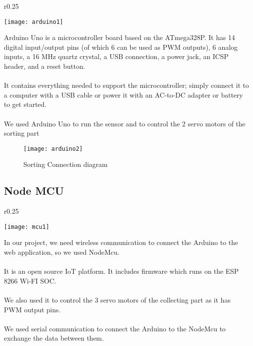 \begin{wrapfigure}{r}{0.25\textwidth}
    \begin{center}
      \texttt{[image: arduino1]}
    \end{center}
  \end{wrapfigure}

  Arduino Uno is a microcontroller board based on the
  ATmega328P. It has 14 digital input/output pins (of which 6
  can be used as PWM outputs), 6 analog inputs, a 16 MHz
  quartz crystal, a USB connection, a power jack, an ICSP
  header, and a reset button.\\\\
  It contains everything needed to support the microcontroller;
  simply connect it to a computer with a USB cable or power it
  with an AC-to-DC adapter or battery to get started.\\\\
  We used Arduino Uno to run the sensor and to control the 2
  servo motors of the sorting part\\


  \begin{figure}[h]
    \texttt{[image: arduino2]}
    \centering
    \caption{Sorting Connection diagram}
    \label{fig:arduino2}
\end{figure}

\subsection{Node MCU}

\begin{wrapfigure}{r}{0.25\textwidth}
    \begin{center}
      \texttt{[image: mcu1]}
    \end{center}
  \end{wrapfigure}

  In our project, we need wireless communication to connect the Arduino
to the web application, so we used NodeMcu.\\\\
It is an open source IoT platform. It includes firmware which runs on
the ESP 8266 Wi-FI SOC.\\\\
We also used it to control the 3 servo motors of the collecting part as it
has PWM output pins.\\\\
We used serial communication to connect the Arduino to the NodeMcu
to exchange the data between them.\\

